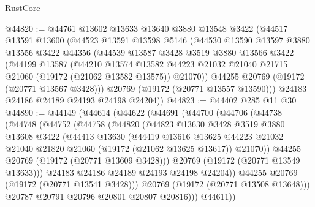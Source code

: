 \begin{lexlean}{RustCore}
\begin{coremodule}
@44820 := @44761
    @13602
    @13633
    @13640
    @3880
    @13548
    @3422
    (@44517
      @13591
      @13600
      (@44523
        @13591
        @13598
        @5146
        (@44530
          @13590
          @13597
          @3880
          @13556
          @3422
          @44356
          (@44539
            @13587
            @3428
            @3519
            @3880
            @13566
            @3422
            (@44199
              @13587
              (@44210
                @13574
                @13582
                @44223
                @21032
                @21040
                @21715
                @21060
                (@19172 (@21062 @13582 @13575))
                @21070))
            @44255
            @20769
            (@19172 (@20771 @13567 @3428)))
          @20769
          (@19172 (@20771 @13557 @13590)))
        @24183
        @24186
        @24189
        @24193
        @24198
        @24204))
@44823 := @44402 @285 @11 @30
@44890 := @44149
    (@44614
      (@44622
        (@44691
          (@44700
            (@44706
              (@44738
                (@44748
                  (@44752
                    (@44758
                      (@44820
                        (@44823
                          @13630
                          @3428
                          @3519
                          @3880
                          @13608
                          @3422
                          (@44413
                            @13630
                            (@44419
                              @13616
                              @13625
                              @44223
                              @21032
                              @21040
                              @21820
                              @21060
                              (@19172 (@21062 @13625 @13617))
                              @21070))
                          @44255
                          @20769
                          (@19172 (@20771 @13609 @3428)))
                        @20769
                        (@19172 (@20771 @13549 @13633)))
                      @24183
                      @24186
                      @24189
                      @24193
                      @24198
                      @24204))
                  @44255
                  @20769
                  (@19172 (@20771 @13541 @3428)))
                @20769
                (@19172 (@20771 @13508 @13648)))
              @20787
              @20791
              @20796
              @20801
              @20807
              @20816)))
        @44611))

\end{coremodule}
\end{lexlean}
